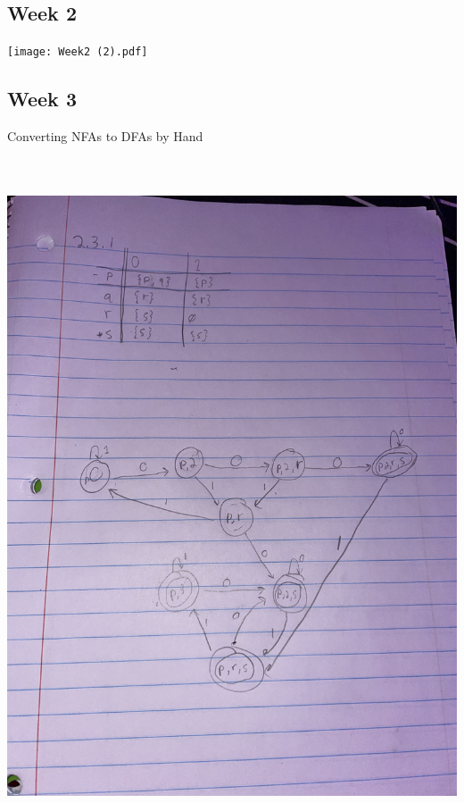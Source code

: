 \documentclass{article}
\theoremstyle{theorem}
\theoremstyle{definition}
\theoremstyle{remark}
\begin{document}
\subsection{Week 2}

\medskip\begin{center}
\texttt{[image: Week2 (2).pdf]}
\end{center}
\clearpage

\subsection{Week 3}
Converting NFAs to DFAs by Hand
\medskip\begin{center}
\includegraphics[width=15cm, height=20cm]{Week3.pdf}
\end{center}
\clearpage
\end{document}
